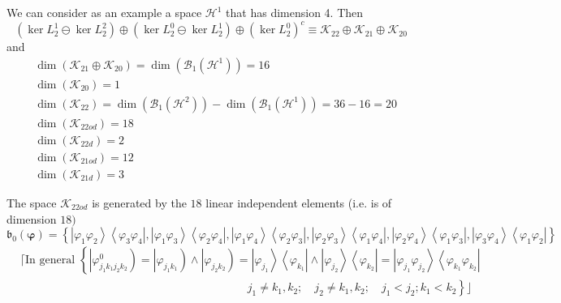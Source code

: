 \documentclass[aps,preprint]{revtex4}%
\begin{document}
We can consider as an example a space $\mathcal{H}^{1}$ that has dimension 4.
Then%
\begin{equation}
\left(  \ker L_{2}^{1}\ominus\ker L_{2}^{2}\right)  \oplus\left(  \ker
L_{2}^{0}\ominus\ker L_{2}^{1}\right)  \oplus\left(  \ker L_{2}^{0}\right)
^{c}\equiv\mathcal{K}_{22}\oplus\mathcal{K}_{21}\oplus\mathcal{K}_{20}%
\end{equation}
and
\begin{align}
&  \dim\left(  \mathcal{K}_{21}\oplus\mathcal{K}_{20}\right)  =\dim\left(
\mathcal{B}_{1}\left(  \mathcal{H}^{1}\right)  \right)  =16\nonumber\\
&  \dim\left(  \mathcal{K}_{20}\right)  =1\nonumber\\
&  \dim\left(  \mathcal{K}_{22}\right)  =\dim\left(  \mathcal{B}_{1}\left(
\mathcal{H}^{2}\right)  \right)  -\dim\left(  \mathcal{B}_{1}\left(
\mathcal{H}^{1}\right)  \right)  =36-16=20\nonumber\\
&  \dim\left(  \mathcal{K}_{22od}\right)  =18\nonumber\\
&  \dim\left(  \mathcal{K}_{22d}\right)  =2\nonumber\\
&  \dim\left(  \mathcal{K}_{21od}\right)  =12\nonumber\\
&  \dim\left(  \mathcal{K}_{21d}\right)  =3
\end{align}


The space $\mathcal{K}_{22od}$ is generated by the $18$ linear independent
elements (i.e. is of dimension $18)$
\begin{equation}
\mathfrak{b}_{0}\left(  \mathbf{\varphi}\right)  =\left\{  \left\vert
\varphi_{1}\varphi_{2}\right\rangle \left\langle \varphi_{3}\varphi
_{4}\right\vert ,\left\vert \varphi_{1}\varphi_{3}\right\rangle \left\langle
\varphi_{2}\varphi_{4}\right\vert ,\left\vert \varphi_{1}\varphi
_{4}\right\rangle \left\langle \varphi_{2}\varphi_{3}\right\vert ,\left\vert
\varphi_{2}\varphi_{3}\right\rangle \left\langle \varphi_{1}\varphi
_{4}\right\vert ,\left\vert \varphi_{2}\varphi_{4}\right\rangle \left\langle
\varphi_{1}\varphi_{3}\right\vert ,\left\vert \varphi_{3}\varphi
_{4}\right\rangle \left\langle \varphi_{1}\varphi_{2}\right\vert \right\}
\end{equation}
\begin{align}
& \mathbf{\lceil}\text{In general }\left\{  \left\vert \varphi_{j_{1}%
k_{1}j_{2}k_{2}}^{0}\right)  =\left\vert \varphi_{j_{1}k_{1}}\right)
\wedge\left\vert \varphi_{j_{2}k_{2}}\right)  =\left\vert \varphi_{j_{1}%
}\right\rangle \left\langle \varphi_{k_{1}}\right\vert \wedge\left\vert
\varphi_{j_{2}}\right\rangle \left\langle \varphi_{k_{2}}\right\vert
=\left\vert \varphi_{j_{1}}\varphi_{j_{2}}\right\rangle \left\langle
\varphi_{k_{1}}\varphi_{k_{2}}\right\vert \right.  \nonumber\\
& \qquad\qquad\qquad\qquad\qquad\qquad\qquad\qquad\qquad\qquad\left.
j_{1}\neq k_{1},k_{2};\quad j_{2}\neq k_{1},k_{2};\quad j_{1}<j_{2}%
;k_{1}<k_{2}\right\}  \rfloor
\end{align}
\end{document}
